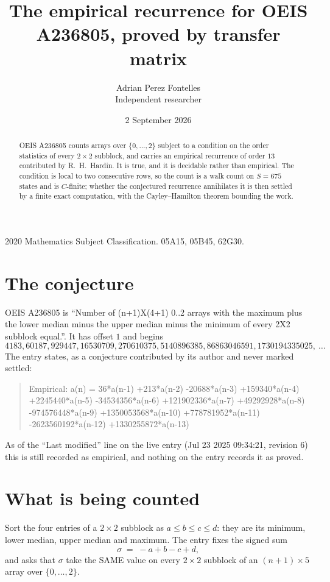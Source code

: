 \documentclass[11pt,a4paper]{article}
\title{The empirical recurrence for OEIS A236805, proved by transfer matrix}
\author{Adrian Perez Fontelles\\ \small Independent researcher}
\date{2 September 2026}
\theoremstyle{plain}
\theoremstyle{definition}
\begin{document}
\maketitle

\begin{abstract}
OEIS A236805 counts arrays over $\{0,\dots,2\}$ subject to a condition on the order
statistics of every $2\times2$ subblock, and carries an empirical recurrence of order
$13$ contributed by R.~H.~Hardin. It is true, and it is decidable rather than empirical.
The condition is local to two consecutive rows, so the count is a walk count on $S=675$
states and is $C$-finite; whether the conjectured recurrence annihilates it is then settled by
a finite exact computation, with the Cayley--Hamilton theorem bounding the work.
\end{abstract}

\noindent\small 2020 Mathematics Subject Classification. 05A15, 05B45, 62G30.\normalsize

\section{The conjecture}

OEIS A236805 is ``Number of (n+1)X(4+1) 0..2 arrays with the maximum plus the lower median minus the upper median minus the minimum of every 2X2 subblock equal.''. It has offset $1$ and begins
\[
4183, 60187, 929447, 16530709, 270610375, 5140896385, 86863046591, 1730194335025,\ \dots
\]
The entry states, as a conjecture contributed by its author and never marked settled:
\begin{quote}
Empirical: a(n) = 36*a(n-1) +213*a(n-2) -20688*a(n-3) +159340*a(n-4) +2245440*a(n-5) -34534356*a(n-6) +121902336*a(n-7) +49292928*a(n-8) -974576448*a(n-9) +1350053568*a(n-10) +778781952*a(n-11) -2623560192*a(n-12) +1330255872*a(n-13)
\end{quote}
As of the ``Last modified'' line on the live entry (Jul 23 2025 09:34:21, revision 6) this is still
recorded as empirical, and nothing on the entry records it as proved.

\section{What is being counted}

Sort the four entries of a $2\times2$ subblock as $a\le b\le c\le d$: they
are its minimum, lower median, upper median and maximum. The entry fixes the signed sum
\[
\sigma\;=\;-a+b-c+d,
\]
and asks that $\sigma$ take the SAME value on every $2\times2$ subblock of an
$(n+1)\times5$ array over $\{0,\dots,2\}$.
\end{document}
